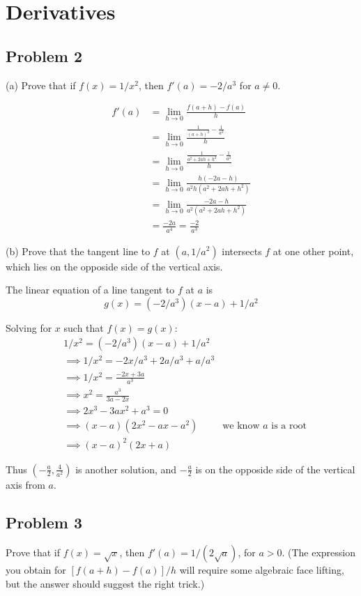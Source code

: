\section{Derivatives}

\subsection*{Problem 2}
(a) Prove that if $f(x)=1/x^2$, then $f'(a)=-2/a^3$ for $a\neq0$.

\begin{align*}
  f'(a)&=\lim_{h\to0}\frac{f(a+h)-f(a)}{h}\\
       &=\lim_{h\to0}\frac{\frac{1}{(a+h)^2}-\frac{1}{a^2}}{h}\\
       &=\lim_{h\to0}\frac{\frac{1}{a^2+2ah+h^2}-\frac{1}{a^2}}{h}\\
       &=\lim_{h\to0}\frac{h(-2a-h)}{a^2h(a^2+2ah+h^2)}\\
       &=\lim_{h\to0}\frac{-2a-h}{a^2(a^2+2ah+h^2)}\\
       &=\frac{-2a}{a^4}=\frac{-2}{a^3}
\end{align*}

(b) Prove that the tangent line to $f$ at $(a, 1/a^2)$ intersects $f$
at one other point, which lies on the opposide side of the vertical
axis.

\vs

The linear equation of a line tangent to $f$ at $a$ is
\[g(x)=(-2/a^3)(x-a)+1/a^2\]

Solving for $x$ such that $f(x)=g(x)$:
\begin{align*}
  &1/x^2=(-2/a^3)(x-a)+1/a^2\\
  &\implies 1/x^2=-2x/a^3+2a/a^3+a/a^3\\
  &\implies 1/x^2=\frac{-2x+3a}{a^3}\\
  &\implies x^2=\frac{a^3}{3a-2x}\\
  &\implies 2x^3-3ax^2+a^3=0\\
  &\implies (x-a)(2x^2-ax-a^2)&\text{we know $a$ is a root}\\
  &\implies (x-a)^2(2x+a)
\end{align*}

Thus $(-\frac{a}{2}, \frac{4}{a^2})$ is another solution, and
$-\frac{a}{2}$ is on the opposide side of the vertical axis from $a$.

\subsection*{Problem 3}
Prove that if $f(x)=\sqrt{x}$, then $f'(a)=1/(2\sqrt{a})$, for $a>0$.
(The expression you obtain for $[f(a+h)-f(a)]/h$ will require some
algebraic face lifting, but the answer should suggest the right
trick.)

